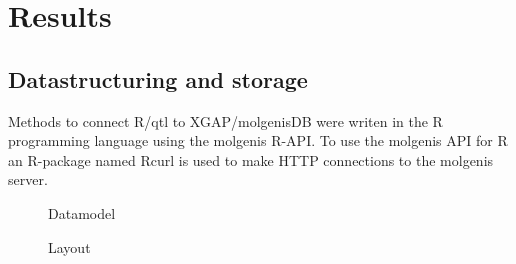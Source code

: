 \section{Results}

\subsection{Datastructuring and storage}
Methods to connect R/qtl to XGAP/molgenisDB were writen in the R programming language using the molgenis R-API. 
To use the molgenis API for R an R-package named Rcurl \cite{Rcurl08} is used to make HTTP connections to the 
molgenis server.

\begin{figure}[ht]  
\centering
  \hfill
  \caption{Datamodel}
  \label{fig:FigDATAMODEL}    
\end{figure}

\begin{figure}[ht]  
\centering
  \hfill
  \caption{Layout}
  \label{fig:FigLAYOUT}    
\end{figure}

